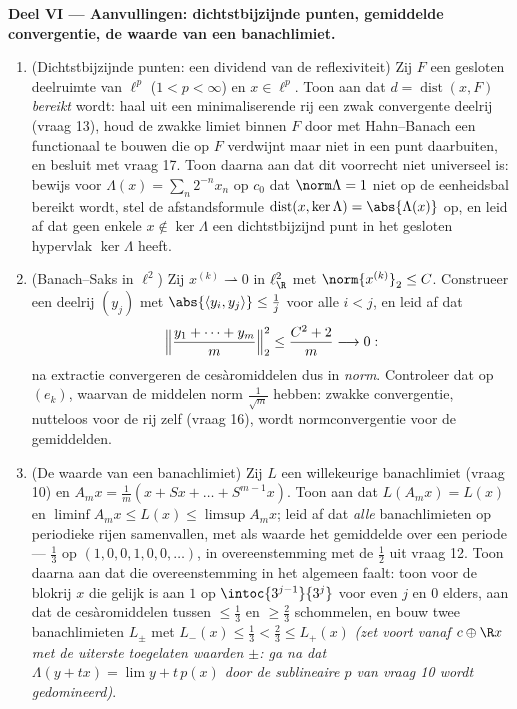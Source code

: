\begin{problem}[{Weekendopgave --- $(\ell^p)' = \ell^q$,
reflexiviteit, en het vreemde van $\ell^\infty$}]
\medskip
\noindent\textbf{Deel VI --- Aanvullingen: dichtstbijzijnde
punten, gemiddelde convergentie, de waarde van een banachlimiet.}
\begin{enumerate}[resume]
  \item (Dichtstbijzijnde punten: een dividend van de
        reflexiviteit) Zij $F$ een gesloten deelruimte van
        $\ell^p$ ($1 < p < \infty$) en $x \in \ell^p$. Toon aan
        dat $d = \operatorname{dist}(x, F)$ \emph{bereikt} wordt:
        haal uit een minimaliserende rij een zwak convergente
        deelrij (vraag 13), houd de zwakke limiet binnen $F$ door
        met Hahn--Banach een functionaal te bouwen die op $F$
        verdwijnt maar niet in een punt daarbuiten, en besluit met
        vraag 17. Toon daarna aan dat dit voorrecht niet
        universeel is: bewijs voor $\Lambda(x) = \sum_n2^{-n}x_n$
        op $c_0$ dat $\norm\Lambda = 1$ niet op de eenheidsbal
        bereikt wordt, stel de afstandsformule
        $\operatorname{dist}(x, \ker\Lambda) = \abs{\Lambda(x)}$
        op, en leid af dat geen enkele $x \notin \ker\Lambda$ een
        dichtstbijzijnd punt in het gesloten hypervlak
        $\ker\Lambda$ heeft.
  \item (Banach--Saks in $\ell^2$) Zij $x^{(k)} \rightharpoonup 0$
        in $\ell^2_{\R}$ met $\norm{x^{(k)}}_2 \leq C$. Construeer
        een deelrij $(y_j)$ met $\abs{\langle y_i, y_j\rangle}
        \leq \frac1j$ voor alle $i < j$, en leid af dat
        \[
        \Bigl\lVert\frac{y_1 + \dots + y_m}m\Bigr\rVert_2^2
        \leq \frac{C^2 + 2}m \longrightarrow 0 :
        \]
        na extractie convergeren de cesàromiddelen dus in
        \emph{norm}. Controleer dat op $(e_k)$, waarvan de
        middelen norm $\frac1{\sqrt m}$ hebben: zwakke
        convergentie, nutteloos voor de rij zelf (vraag 16), wordt
        normconvergentie voor de gemiddelden.
  \item (De waarde van een banachlimiet) Zij $L$ een willekeurige
        banachlimiet (vraag 10) en $A_mx = \frac1m(x + Sx + \dots
        + S^{m-1}x)$. Toon aan dat $L(A_mx) = L(x)$ en $\liminf
        A_mx \leq L(x) \leq \limsup A_mx$; leid af dat \emph{alle}
        banachlimieten op periodieke rijen samenvallen, met als
        waarde het gemiddelde over een periode --- $\frac13$ op
        $(1, 0, 0, 1, 0, 0, \dots)$, in overeenstemming met de
        $\frac12$ uit vraag 12. Toon daarna aan dat die
        overeenstemming in het algemeen faalt: toon voor de
        blokrij $x$ die gelijk is aan $1$ op
        $\intoc{3^{j-1}}{3^j}$ voor even $j$ en $0$ elders, aan
        dat de cesàromiddelen tussen $\leq \frac13$ en $\geq
        \frac23$ schommelen, en bouw twee banachlimieten $L_\pm$
        met $L_-(x) \leq \frac13 < \frac23 \leq L_+(x)$
        \emph{(zet voort vanaf $c \oplus \R x$ met de uiterste
        toegelaten waarden $\pm$: ga na dat $\Lambda(y + tx) =
        \lim y + t\,p(x)$ door de sublineaire $p$ van vraag 10
        wordt gedomineerd)}.
\end{enumerate}
\end{problem}

